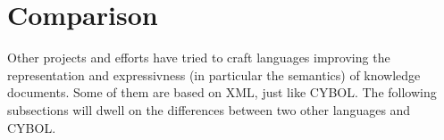 %
%
%
%
%
%
%

\section{Comparison}
\label{comparison_heading}

Other projects and efforts have tried to craft languages improving the
representation and expressivness (in particular the semantics) of knowledge
documents. Some of them are based on XML, just like CYBOL. The following
subsections will dwell on the differences between two other languages and
CYBOL.



